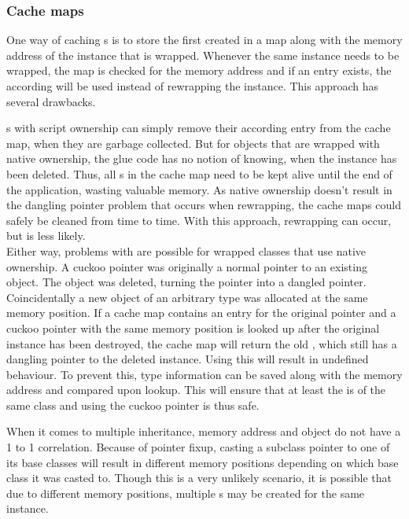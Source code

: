 \subsubsection{Cache maps}

One way of caching s is to store the first created  in a map along with the memory address of the instance that is wrapped. Whenever the same instance needs to be wrapped, the map is checked for the memory address and if an entry exists, the according  will be used instead of rewrapping the  instance. This approach has several drawbacks.

s with script ownership can simply remove their according entry from the cache map, when they are garbage collected. But for objects that are wrapped with native ownership, the glue code has no notion of knowing, when the  instance has been deleted. Thus, all s in the cache map need to be kept alive until the end of the application, wasting valuable memory. As native ownership doesn't result in the  dangling pointer problem that occurs when rewrapping, the cache maps could safely be cleaned from time to time. With this approach, rewrapping can occur, but is less likely.\\
Either way, problems with  are possible for wrapped classes that use native ownership. A cuckoo pointer was originally a normal pointer to an existing object. The object was deleted, turning the pointer into a dangled pointer. Coincidentally a new object of an arbitrary type was allocated at the same memory position. If a cache map contains an entry for the original pointer and a cuckoo pointer with the same memory position is looked up after the original instance has been destroyed, the cache map will return the old , which still has a dangling pointer to the deleted instance. Using this  will result in undefined behaviour. To prevent this, type information can be saved along with the memory address and compared upon lookup. This will ensure that at least the  is of the same class and using the cuckoo pointer is thus safe.

When it comes to multiple inheritance, memory address and object do not have a 1 to 1 correlation. Because of pointer fixup, casting a subclass pointer to one of its base classes will result in different memory positions depending on which base class it was casted to. Though this is a very unlikely scenario, it is possible that due to different memory positions, multiple s may be created for the same instance.

